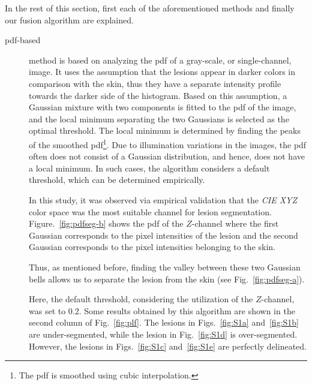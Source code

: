 In the rest of this section, first each of the aforementioned methods and finally our fusion algorithm are explained. 
\begin{description}
\item[\ac{pdf}-based] method is based on analyzing the \ac{pdf} of a gray-scale, or single-channel, image.
It uses the assumption that the lesions appear in darker colors in comparison with the skin, thus they have a separate intensity profile towards the darker side of the histogram.
Based on this assumption, a Gaussian mixture with two components is fitted to the \ac{pdf} of the image, and the local minimum separating the two Gaussians is selected as the optimal threshold.
The local minimum is determined by finding the peaks of the smoothed \ac{pdf}\footnote{The \ac{pdf} is smoothed using cubic interpolation.}.
Due to illumination variations in the images, the \ac{pdf} often does not consist of a Gaussian distribution, and hence, does not have a local minimum. 
In such cases, the algorithm considers a default threshold, which can be determined empirically.  

In this study, it was observed via empirical validation that the \textit{CIE XYZ} color space was the most suitable channel for lesion segmentation.
Figure.~\ref{fig:pdfseg-b} shows the \ac{pdf} of the $Z$-channel where the first Gaussian corresponds to the pixel intensities of the lesion and the second Gaussian corresponds to the pixel intensities belonging to the skin.

Thus, as mentioned before, finding the valley between these two Gaussian bells allows us to separate the lesion from the skin (see Fig.~\ref{fig:pdfseg-a}). 

\noindent Here, the default threshold, considering the utilization of the $Z$-channel, was set to 0.2.
Some results obtained by this algorithm are shown in the second column of Fig.~\ref{fig:plf}.
The lesions in Figs.~\ref{fig:S1a} and~\ref{fig:S1b} are under-segmented, while the lesion in Fig.~\ref{fig:S1d} is over-segmented.
However, the lesions in Figs.~\ref{fig:S1c} and~\ref{fig:S1e} are perfectly delineated.


\end{description}
